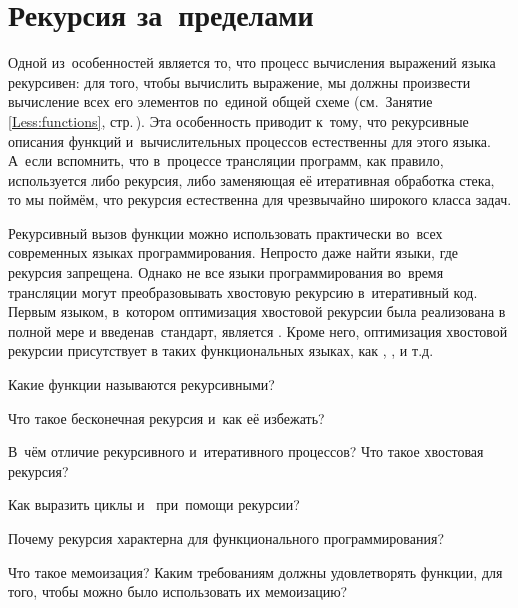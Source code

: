 \section{Рекурсия за~преде\-лами~\Scheme}%
Одной из~особенностей \Scheme является то, что процесс вычисления выражений языка рекурсивен: для того, чтобы вычислить выражение, мы должны произвести вычисление всех его элементов по~единой общей схеме (см.~Занятие\,\ref{Less:functions}, стр.\,\pageref{applicative-order}). Эта особенность приводит к~тому, что рекурсивные описания функций и~вычислительных процессов естественны для этого языка. А~если вспомнить, что в~процессе трансляции программ, как правило, используется либо рекурсия, либо заменяющая её итеративная обработка стека, то мы поймём, что рекурсия естественна для чрезвычайно широкого класса задач.

Рекурсивный вызов функции можно использовать практически во~всех современных языках программирования. Непросто даже найти языки, где рекурсия запрещена. Однако не все языки программирования во~время трансляции могут преобразовывать хвостовую рекурсию в~итеративный код. Первым языком, в~котором оптимизация хвостовой рекурсии была реализована в полной мере и введенав~стандарт, является . Кроме него, оптимизация хвостовой рекурсии присутствует в таких функциональных языках, как , ,  и т.д.

\begin{Queeze}

  \item Какие функции называются рекурсивными?

  \item Что такое бесконечная рекурсия и~как её избежать?

  \item В~чём отличие рекурсивного и~итеративного процессов? Что такое хвостовая рекурсия?

  \item Как выразить циклы  и~ при~помощи рекурсии?

  \item Почему рекурсия характерна для функционального программирования?

  \item Что такое мемоизация? Каким требованиям должны удовлетворять функции, для того, чтобы можно было использовать их мемоизацию?
\end{Queeze}

